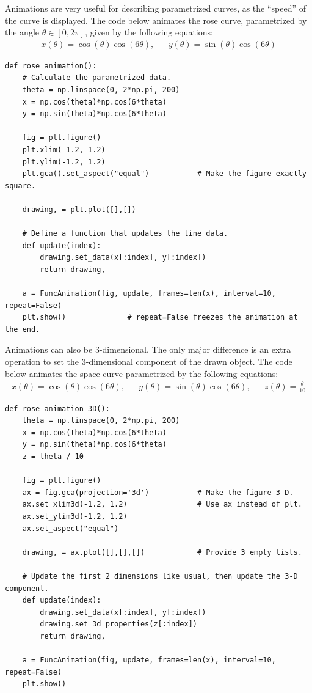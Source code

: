 Animations are very useful for describing parametrized curves, as the ``speed'' of the curve is displayed.
The code below animates the rose curve, parametrized by the angle $\theta \in [0, 2\pi]$, given by the following equations:
%
\[\begin{array}{ccc}
x(\theta) = \cos(\theta)\cos(6\theta), && y(\theta) = \sin(\theta)\cos(6\theta)
\end{array}\]

\begin{lstlisting}
def rose_animation():
    # Calculate the parametrized data.
    theta = np.linspace(0, 2*np.pi, 200)
    x = np.cos(theta)*np.cos(6*theta)
    y = np.sin(theta)*np.cos(6*theta)

    fig = plt.figure()
    plt.xlim(-1.2, 1.2)
    plt.ylim(-1.2, 1.2)
    plt.gca().set_aspect("equal")           # Make the figure exactly square.

    drawing, = plt.plot([],[])

    # Define a function that updates the line data.
    def update(index):
        drawing.set_data(x[:index], y[:index])
        return drawing,

    a = FuncAnimation(fig, update, frames=len(x), interval=10, repeat=False)
    plt.show()              # repeat=False freezes the animation at the end.
\end{lstlisting}

Animations can also be 3-dimensional.
The only major difference is an extra operation to set the 3-dimensional component of the drawn object.
The code below animates the space curve parametrized by the following equations:
%
\[\begin{array}{ccccc}
x(\theta) = \cos(\theta)\cos(6\theta), &&
y(\theta) = \sin(\theta)\cos(6\theta), &&
z(\theta) = \frac{\theta}{10}
\end{array}\]

\begin{lstlisting}
def rose_animation_3D():
    theta = np.linspace(0, 2*np.pi, 200)
    x = np.cos(theta)*np.cos(6*theta)
    y = np.sin(theta)*np.cos(6*theta)
    z = theta / 10

    fig = plt.figure()
    ax = fig.gca(projection='3d')           # Make the figure 3-D.
    ax.set_xlim3d(-1.2, 1.2)                # Use ax instead of plt.
    ax.set_ylim3d(-1.2, 1.2)
    ax.set_aspect("equal")

    drawing, = ax.plot([],[],[])            # Provide 3 empty lists.

    # Update the first 2 dimensions like usual, then update the 3-D component.
    def update(index):
        drawing.set_data(x[:index], y[:index])
        drawing.set_3d_properties(z[:index])
        return drawing,

    a = FuncAnimation(fig, update, frames=len(x), interval=10, repeat=False)
    plt.show()
\end{lstlisting}

